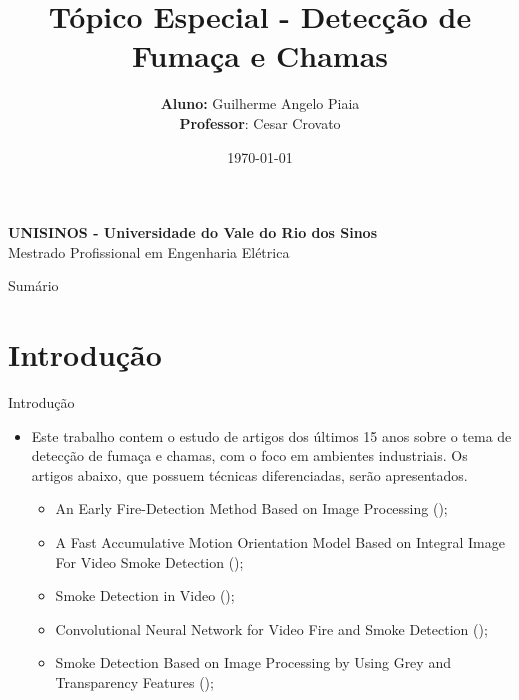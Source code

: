 \documentclass{beamer}
\title[Tópico Especial - Detecção de Fumaça e Chamas]{Tópico Especial - Detecção de Fumaça e Chamas}
\author[Piaia, G. A.]{
	{\fontsize{10}{8}\selectfont \textbf{Aluno:} Guilherme Angelo Piaia} \\
	{\fontsize{10}{8}\selectfont \textbf{Professor}: Cesar Crovato}
}
\date{\today}
\begin{document}

\begin{frame}
	\begin{minipage}{1\linewidth}
		\centering
		    \textbf{UNISINOS - Universidade do Vale do Rio dos Sinos} \\ Mestrado Profissional em Engenharia Elétrica
	\end{minipage}
	\titlepage
\end{frame}


\begin{frame}{Sumário}
	\tableofcontents[]
\end{frame}


\section{Introdução}
\begin{frame}{Introdução}
	\begin{itemize}
		\justifying
		\item Este trabalho contem o estudo de artigos dos últimos 15 anos sobre o tema de detecção de fumaça e chamas, com o
		foco em ambientes industriais. Os artigos abaixo, que possuem técnicas diferenciadas, serão apresentados.
		\begin{itemize}
			\justifying
			\item An Early Fire-Detection Method Based on Image Processing ();
			\item A Fast Accumulative Motion Orientation Model Based on Integral Image For Video 
			Smoke Detection ();
			\item Smoke Detection in Video ();
			\item Convolutional Neural Network for Video Fire and Smoke Detection ();
			\item Smoke Detection Based on Image Processing by Using Grey and Transparency Features ();
		\end{itemize}
	\end{itemize}
\end{frame}


\section{}
\end{document}
